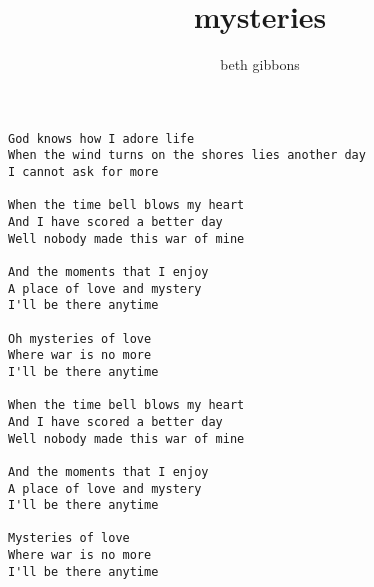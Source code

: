 \author{beth gibbons}
\title{mysteries}
\maketitle
\begin{verbatim}
God knows how I adore life
When the wind turns on the shores lies another day
I cannot ask for more

When the time bell blows my heart
And I have scored a better day
Well nobody made this war of mine

And the moments that I enjoy
A place of love and mystery
I'll be there anytime

Oh mysteries of love
Where war is no more
I'll be there anytime

When the time bell blows my heart
And I have scored a better day
Well nobody made this war of mine

And the moments that I enjoy
A place of love and mystery
I'll be there anytime

Mysteries of love
Where war is no more
I'll be there anytime
\end{verbatim}